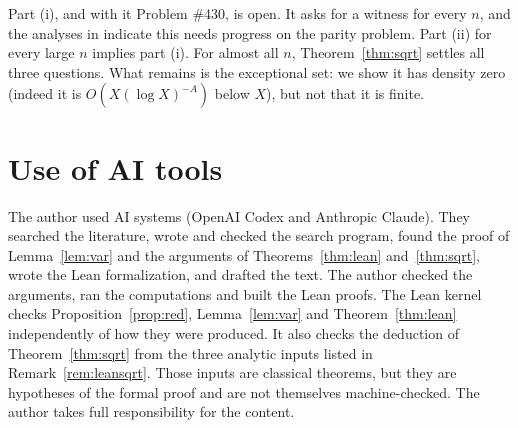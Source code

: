 \documentclass[11pt,letterpaper]{article}
\theoremstyle{remark}
\begin{document}
Part (i), and with it Problem \#430, is open. It asks for a witness for every
$n$, and the analyses in \cite{tao} indicate this needs progress on the
parity problem. Part (ii) for every large $n$ implies part (i). For almost all
$n$, Theorem~\ref{thm:sqrt} settles all three questions. What remains is the
exceptional set: we show it has density zero (indeed it is
$O(X(\log X)^{-A})$ below $X$), but not that it is finite.

\section*{Use of AI tools}

The author used AI systems (OpenAI Codex and Anthropic Claude). They searched
the literature, wrote and checked the search program, found the proof of
Lemma~\ref{lem:var} and the arguments of Theorems~\ref{thm:lean}
and~\ref{thm:sqrt}, wrote the Lean formalization, and drafted the text. The
author checked the arguments, ran the computations and built the Lean proofs.
The Lean kernel checks Proposition~\ref{prop:red}, Lemma~\ref{lem:var} and
Theorem~\ref{thm:lean} independently of how they were produced. It also checks
the deduction of Theorem~\ref{thm:sqrt} from the three analytic inputs listed in
Remark~\ref{rem:leansqrt}. Those inputs are classical theorems, but they are
hypotheses of the formal proof and are not themselves machine-checked. The author takes full
responsibility for the content.
\end{document}
